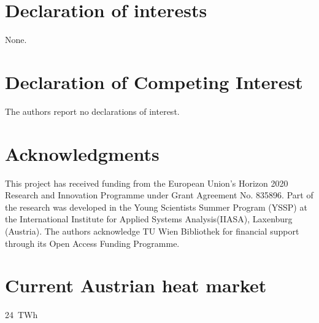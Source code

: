 \documentclass[review]{elsarticle}
\begin{document}





\section*{Declaration of interests}
None.
\section*{Declaration of Competing Interest}
The authors report no declarations of interest.
\section*{Acknowledgments}
This project has received funding from the European Union's Horizon 2020 Research and Innovation Programme under Grant Agreement No. 835896. Part of the research was developed in the Young Scientists Summer Program (YSSP) at the International Institute for Applied Systems Analysis(IIASA), Laxenburg (Austria). The authors acknowledge TU Wien Bibliothek for financial support through its Open Access Funding Programme.


\appendix
\setcounter{table}{0}
\setcounter{figure}{0}
\newpage
\section{Current Austrian heat market}\label{appendixC}
  \SI{24}{TWh}   
\end{document}
